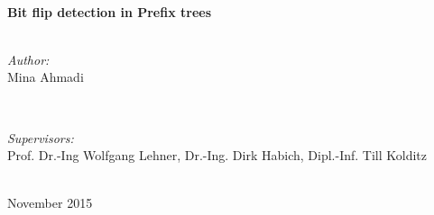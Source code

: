 \documentclass{report}
\begin{document}
\begin{titlepage}

\HRule \\[0.4cm]
{ \huge \bfseries Bit flip detection in Prefix trees}\\[0.4cm] %
\HRule \\[1.5cm]
 

\begin{minipage}{0.4\textwidth}
\begin{flushleft} \large
\emph{Author:}\\
Mina Ahmadi %
\end{flushleft}
\end{minipage}
~
\begin{minipage}{0.47\textwidth}
\begin{flushright} \large
\emph{Supervisors:} \\
Prof. Dr.-Ing Wolfgang Lehner, Dr.-Ing. Dirk Habich, Dipl.-Inf. Till Kolditz  %
\end{flushright}
\end{minipage}\\[4cm]





{\large{November 2015}}\\[3cm] %
 

\vfill %

\end{titlepage}
\end{document}
